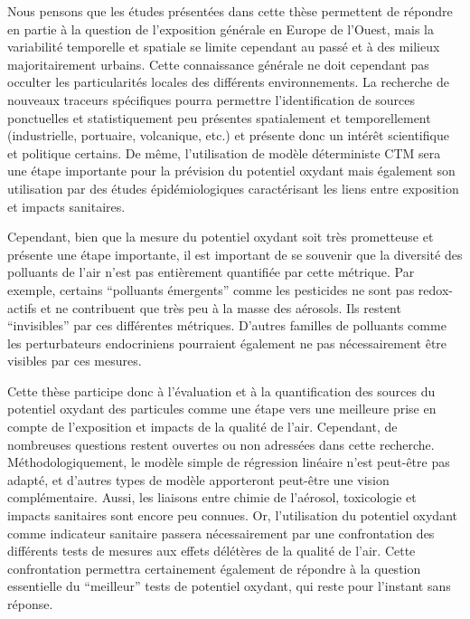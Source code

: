 Nous pensons que les études présentées dans cette thèse permettent de répondre en partie à
la question de l'exposition générale en Europe de l'Ouest, mais la variabilité temporelle
et spatiale se limite cependant au passé et à des milieux majoritairement urbains.
Cette connaissance générale ne doit cependant pas occulter les particularités locales des
différents environnements.
La recherche de nouveaux traceurs spécifiques pourra permettre l'identification de sources
ponctuelles et statistiquement peu présentes spatialement et temporellement
(industrielle, portuaire, volcanique, etc.) et présente donc un intérêt scientifique et
politique certains.
De même, l'utilisation de modèle déterministe CTM sera une étape importante pour la
prévision du potentiel oxydant mais également son utilisation par des études
épidémiologiques caractérisant les liens entre exposition et impacts sanitaires.

Cependant, bien que la mesure du potentiel oxydant soit très prometteuse et présente une
étape importante, il est important de se souvenir que la diversité des polluants de l'air
n'est pas entièrement quantifiée par cette métrique.  Par exemple, certains ``polluants
émergents'' comme les pesticides ne sont pas redox-actifs et ne contribuent que très peu à
la masse des aérosols. Ils restent ``invisibles'' par ces différentes métriques. D'autres
familles de polluants comme les perturbateurs endocriniens pourraient
également ne pas nécessairement être visibles par ces mesures.

Cette thèse participe donc à l'évaluation et à la quantification des sources
du potentiel oxydant des particules comme une étape vers une meilleure prise en compte de
l'exposition et impacts de la qualité de l'air. Cependant, de nombreuses questions restent
ouvertes ou non adressées dans cette recherche. Méthodologiquement, le modèle simple de
régression linéaire n'est peut-être pas adapté, et d'autres types de modèle apporteront
peut-être une vision complémentaire. Aussi, les liaisons entre chimie de l'aérosol,
toxicologie et impacts sanitaires sont encore peu connues. Or, l'utilisation du potentiel
oxydant comme indicateur sanitaire passera nécessairement par une confrontation des
différents tests de mesures aux effets délétères de la qualité de l'air. Cette
confrontation permettra certainement également de répondre à la question essentielle du
``meilleur'' tests de potentiel oxydant, qui reste pour l'instant sans réponse.

